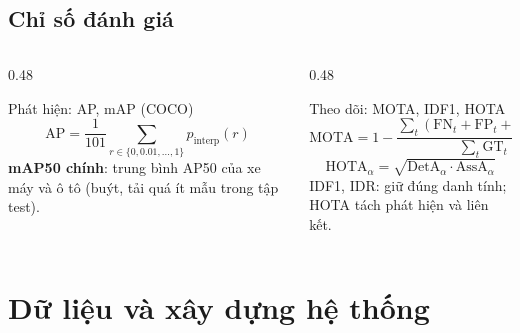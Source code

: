 \documentclass[aspectratio=\mlwAspectRatio, \mlwBaseSize, t]{beamer}
\begin{document}
\subsection{Chỉ số đánh giá}
\begin{frame}{\stitle}
  \begin{columns}[T]
    \begin{column}{0.48\textwidth}
      \begin{block}{Phát hiện: AP, mAP (COCO)}
        \[
          \mathrm{AP} = \frac{1}{101} \sum_{r \in \{0, 0.01, \ldots, 1\}} p_{\mathrm{interp}}(r)
        \]
        \textbf{mAP50 chính}: trung bình AP50 của xe máy và ô tô (buýt, tải quá ít mẫu trong tập test).
      \end{block}
    \end{column}
    \begin{column}{0.48\textwidth}
      \begin{block}{Theo dõi: MOTA, IDF1, HOTA}
        \[
          \mathrm{MOTA} = 1 - \frac{\sum_t (\mathrm{FN}_t + \mathrm{FP}_t + \mathrm{IDSW}_t)}{\sum_t \mathrm{GT}_t}
        \]
        \[
          \mathrm{HOTA}_\alpha = \sqrt{\mathrm{DetA}_\alpha \cdot \mathrm{AssA}_\alpha}
        \]
        IDF1, IDR: giữ đúng danh tính; HOTA tách phát hiện và liên kết.
      \end{block}
    \end{column}
  \end{columns}
\end{frame}

\section{Dữ liệu và xây dựng hệ thống}
\end{document}

